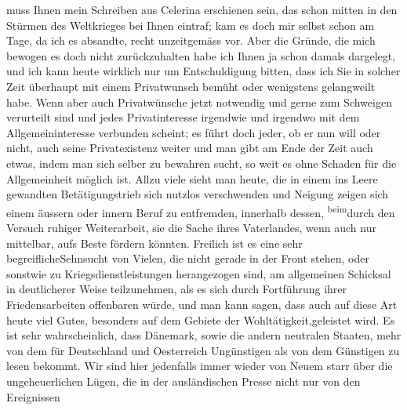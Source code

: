 \begin{ledgroupsized}[t]{13cm}
               muss Ihnen mein Schreiben aus Celerina
               erschienen sein, das schon mitten in den Stürmen des Weltkrieges bei Ihnen eintraf;
               kam es doch mir selbst schon am Tage, da ich es absandte, recht unzeitgemäss vor.
               Aber die Gründe, die mich bewogen es doch nicht zurückzuhalten habe ich Ihnen ja  schon damals dargelegt\introOben{},\introOben{}
               und ich kann heute wirklich nur um Entschuldigung bitten, dass ich Sie in solcher
               Zeit überhaupt mit einem Privatwunsch bemüht oder wenigstens gelangweilt habe. Wenn
               aber auch Privatwünsche jetzt notwendig und gerne zum Schweigen verurteilt sind und
               jedes Privatinteresse irgendwie und irgendwo mit dem Allgemeininteresse verbunden
               scheint; es führt {\pb}doch jeder, ob er nun will oder
               nicht, auch seine Privatexistenz weiter und man gibt am Ende der Zeit auch etwas,
               indem man sich selber zu bewahren sucht, so weit es ohne Schaden für die
               Allgemeinheit möglich ist. Allzu viele sieht man heute, die in einem ins Leere
               gewandten Betätigungstrieb sich nutzlos verschwenden und Neigung zeigen sich einem
               äussern oder innern Beruf zu entfremden, innerhalb dessen, \substVorne{}\textsuperscript{beim}\substDazwischen{}durch den\substHinten{} Versuch ruhiger Weiterarbeit, sie die Sache ihres Vaterlandes, wenn auch nur
               mittelbar, aufs Beste fördern könnten. Freilich ist \introOben{}es eine sehr
                  begreifliche\introOben{}Sehnsucht von Vielen, die nicht gerade in der Front
               stehen, oder sonstwie zu Kriegsdienstleistungen herangezogen sind, am allgemeinen
               Schicksal in deutlicherer Weise teilzunehmen, als es sich durch Fortführung ihrer
               Friedensarbeiten offenbaren würde, und man kann sagen, dass auch auf diese Art heute
               viel Gutes, besonders auf dem Gebiete der Wohltätigkeit,geleistet wird.\pend
           \pstart
           Es ist sehr wahrscheinlich, dass {\pb}Dänemark, sowie die andern neutralen Staaten,
               mehr von dem für Deutschland und Oesterreich Ungünstigen als von dem Günstigen zu
               lesen bekommt. Wir sind hier jedenfalls immer wieder von Neuem starr über die
               ungeheuerlichen Lügen, die in der ausländischen Presse nicht nur von den Ereignissen

\end{ledgroupsized}
